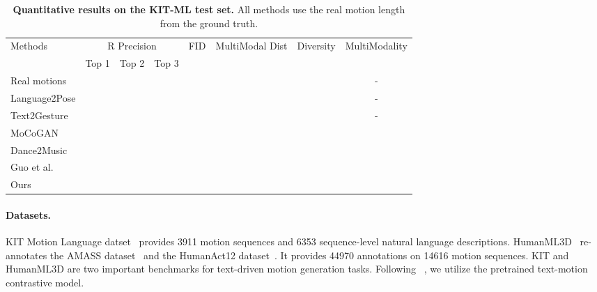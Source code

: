 \begin{table*}[ht]
\centering
\caption{\textbf{Quantitative results on the KIT-ML test set.} All methods use the real motion length from the ground truth.}
\label{tab:kit}
\setlength{\tabcolsep}{1.4mm}
{
\begin{tabular}{lccccccc}
\hline

\multirow{2}{2cm}{\centering Methods} & \multicolumn{3}{c}{\centering R Precision} & \multirow{2}{1.5cm}{\centering FID} & \multirow{2}{2.5cm}{\centering MultiModal Dist} & \multirow{2}{2cm}{\centering Diversity} & \multirow{2}{2cm}{\centering MultiModality} \\
& Top 1 & Top 2 & Top 3 \\
\hline
Real motions &  &  &  &  &  &  & -\\ 
\hline

Language2Pose &  &  &  &  &  &  & - \\

Text2Gesture &  &  &  &  &  &  & - \\

MoCoGAN &  &  &  &  &  &  &
 \\

Dance2Music &  &  &  &  &  &  &  \\

Guo et al. &  &  &  &  &  &  &  \\
\hline
Ours &  &  &  &  &  &  & \\
\hline
\end{tabular}}
\end{table*}

\paragraph{Datasets.}\label{sec4_1_1} KIT Motion Language datset~\citep{plappert2016kit} provides 3911 motion sequences and 6353 sequence-level natural language descriptions. HumanML3D~\citep{guo2022generating} re-annotates the AMASS dataset~\citep{mahmood2019amass} and the HumanAct12 dataset~\citep{guo2020action2motion}. It provides 44970 annotations on 14616 motion sequences. KIT and HumanML3D are two important benchmarks for text-driven motion generation tasks. Following ~\cite{guo2022generating}, we utilize the pretrained text-motion contrastive model.

